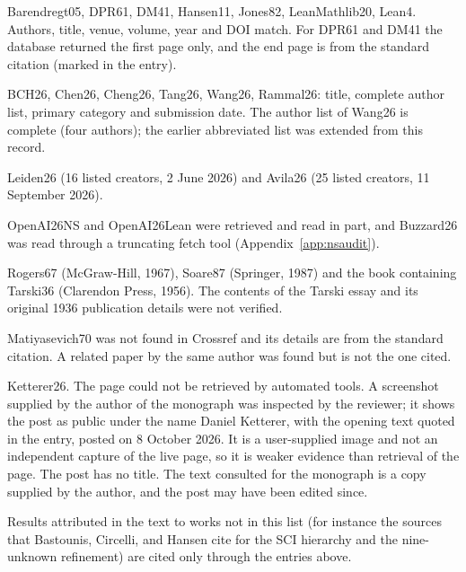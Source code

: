 \begin{description}[leftmargin=1.2cm,font=\normalfont\bfseries]
\item[Checked against Crossref.] Barendregt05, DPR61, DM41, Hansen11, Jones82, LeanMathlib20, Lean4. Authors, title, venue, volume, year and DOI match. For DPR61 and DM41 the database returned the first page only, and the end page is from the standard citation (marked in the entry).
\item[Checked against the arXiv API.] BCH26, Chen26, Cheng26, Tang26, Wang26, Rammal26: title, complete author list, primary category and submission date. The author list of Wang26 is complete (four authors); the earlier abbreviated list was extended from this record.
\item[Checked against Zenodo records.] Leiden26 (16 listed creators, 2 June 2026) and Avila26 (25 listed creators, 11 September 2026).
\item[Checked at the artifact.] OpenAI26NS and OpenAI26Lean were retrieved and read in part, and Buzzard26 was read through a truncating fetch tool (Appendix~\ref{app:nsaudit}).
\item[Checked for existence only (Open Library).] Rogers67 (McGraw-Hill, 1967), Soare87 (Springer, 1987) and the book containing Tarski36 (Clarendon Press, 1956). The contents of the Tarski essay and its original 1936 publication details were not verified.
\item[Not located.] Matiyasevich70 was not found in Crossref and its details are from the standard citation. A related paper by the same author was found but is not the one cited.
\item[Screenshot inspected, not independently verified.] Ketterer26. The page could not be retrieved by automated tools. A screenshot supplied by the author of the monograph was inspected by the reviewer; it shows the post as public under the name Daniel Ketterer, with the opening text quoted in the entry, posted on 8 October 2026. It is a user-supplied image and not an independent capture of the live page, so it is weaker evidence than retrieval of the page. The post has no title. The text consulted for the monograph is a copy supplied by the author, and the post may have been edited since.
\item[Cited at second hand.] Results attributed in the text to works not in this list (for instance the sources that Bastounis, Circelli, and Hansen cite for the SCI hierarchy and the nine-unknown refinement) are cited only through the entries above.
\end{description}
